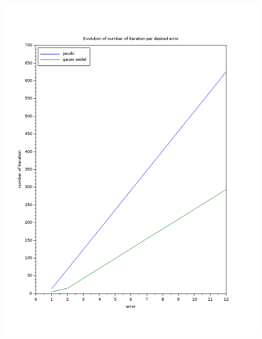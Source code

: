 \documentclass[11pt]{article}
\begin{document}
\includegraphics[scale=0.5]{img/error.png}
\end{document}
